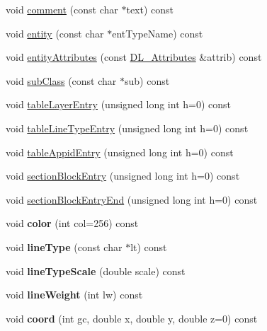 \begin{DoxyCompactItemize}
\item 
void \hyperlink{classDL__Writer_a69dbad0d83a751d161e3718d071d5f24}{comment} (const char $\ast$text) const 
\item 
void \hyperlink{classDL__Writer_a55109d20ddd87ad72d817304f98f3cae}{entity} (const char $\ast$ent\-Type\-Name) const 
\item 
void \hyperlink{classDL__Writer_a4debd0a1443f3da3c88bf6f29a4a928d}{entity\-Attributes} (const \hyperlink{classDL__Attributes}{D\-L\-\_\-\-Attributes} \&attrib) const 
\item 
void \hyperlink{classDL__Writer_aa91b4c49488401ea31ed0b8c369232f5}{sub\-Class} (const char $\ast$sub) const 
\item 
void \hyperlink{classDL__Writer_ac4fcc7e465b802c5f0f0eada3fe56af0}{table\-Layer\-Entry} (unsigned long int h=0) const 
\item 
void \hyperlink{classDL__Writer_a6603d8a37857c32f901f9b8fc5fb0f7a}{table\-Line\-Type\-Entry} (unsigned long int h=0) const 
\item 
void \hyperlink{classDL__Writer_a25a419e135b76606b03f4a97ec2fcf23}{table\-Appid\-Entry} (unsigned long int h=0) const 
\item 
void \hyperlink{classDL__Writer_a94e8d883b724d20f6b8b9895c67b89b6}{section\-Block\-Entry} (unsigned long int h=0) const 
\item 
void \hyperlink{classDL__Writer_a17615ab803fde8ddbea15f735f860b9c}{section\-Block\-Entry\-End} (unsigned long int h=0) const 
\item 
\hypertarget{classDL__Writer_a5906ad8025b82a1b43cfd8317517e374}{void {\bfseries color} (int col=256) const }\label{classDL__Writer_a5906ad8025b82a1b43cfd8317517e374}

\item 
\hypertarget{classDL__Writer_a33309657733b22fe7889065523bae1ba}{void {\bfseries line\-Type} (const char $\ast$lt) const }\label{classDL__Writer_a33309657733b22fe7889065523bae1ba}

\item 
\hypertarget{classDL__Writer_a84d470c94ad69c084df2ceb148e2206c}{void {\bfseries line\-Type\-Scale} (double scale) const }\label{classDL__Writer_a84d470c94ad69c084df2ceb148e2206c}

\item 
\hypertarget{classDL__Writer_a8f9c2b81e9659a6e3706ae58a3a67578}{void {\bfseries line\-Weight} (int lw) const }\label{classDL__Writer_a8f9c2b81e9659a6e3706ae58a3a67578}

\item 
\hypertarget{classDL__Writer_addb23e58611f3ff75cdaec798dab3a1c}{void {\bfseries coord} (int gc, double x, double y, double z=0) const }\label{classDL__Writer_addb23e58611f3ff75cdaec798dab3a1c}


\end{DoxyCompactItemize}
